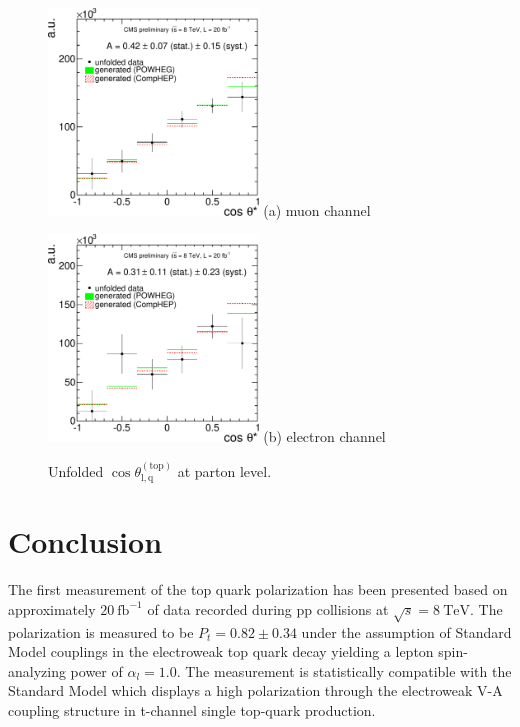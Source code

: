 \documentclass[a4paper]{jpconf}
\newcommand{\unit}[1]{\ensuremath{\mathrm{~#1}}}
\newcommand{\costheta}[0]{\cos\theta_{\mathrm{l,q}}^{\mathrm{(top)}}}
\begin{document}
\begin{figure}[h]
\begin{center}
\begin{minipage}{7cm}
\includegraphics[height=5.5cm]{costheta_unfolded_mu-crop}
\center (a) muon channel
\end{minipage}\hspace{1cm}%
\begin{minipage}{7cm}
\includegraphics[height=5.5cm]{costheta_unfolded_el-crop}
\center (b) electron channel
\end{minipage} 
\caption{\label{fig:unfoldcostheta}Unfolded $\costheta$ at parton level.}
\end{center}
\vspace{-0.7cm}
\end{figure}

\section{Conclusion}
The first measurement of the top quark polarization has been presented based on approximately $20\unit{fb^{-1}}$ of data recorded during pp collisions at $\sqrt{s}=8\unit{TeV}$.
The polarization is measured to be $P_{t}=0.82 \pm 0.34$ under the assumption of Standard Model couplings in the electroweak top quark decay yielding a lepton spin-analyzing power of $\alpha_{l}=1.0$. The measurement is statistically compatible with the Standard Model which displays a high polarization through the electroweak V-A coupling structure in t-channel single top-quark production.
\end{document}
